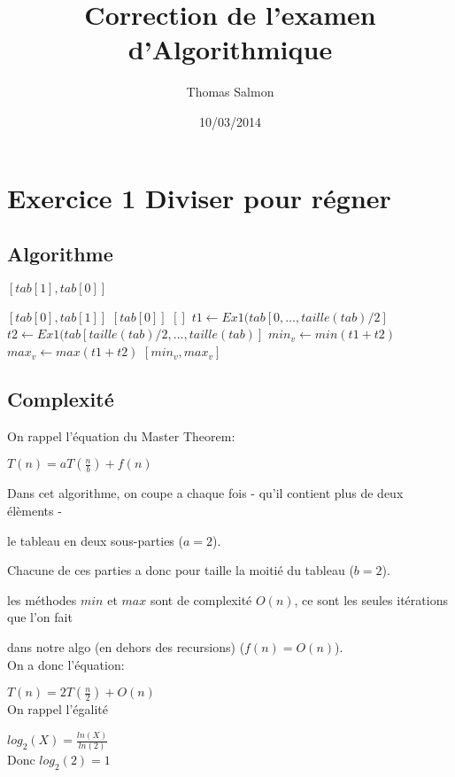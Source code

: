 \documentclass[a4paper]{article}
\title{Correction de l'examen d'Algorithmique}
\author{Thomas Salmon}
\date{10/03/2014}
\begin{document}
\maketitle
\section{Exercice 1 Diviser pour régner}
\subsection{Algorithme}
\begin{algorithmic}
	
		\State \Return $[tab[1], tab[0]]$
	\Else
	
		\State \Return $[tab[0], tab[1]]$
	\EndIf
{}
	\State \Return $[tab[0]]$
	\State \Return $[]$
\Else
\State $t1\gets Ex1(tab[0, \dots, taille(tab)/2]$
\State $t2\gets Ex1(tab[taille(tab)/2, \dots, taille(tab)]$
\State $min_v \gets  min(t1+t2)$
\State	$max_v \gets max(t1+t2)$
\State \Return $[min_v, max_v]$
\EndIf
\EndFunction
\end{algorithmic}
\subsection{Complexité}
On rappel l'équation du Master Theorem:

$T(n) = aT(\frac{n}{b}) + f(n)$

Dans cet algorithme, on coupe a chaque fois - qu'il contient plus de deux élèments - 

le tableau en deux sous-parties ($a = 2$).

Chacune de ces parties a donc pour taille la moitié du tableau ($b = 2$).

les méthodes $min$ et $max$ sont de complexité $O(n)$, ce sont les seules itérations que l'on fait 

dans notre algo (en dehors des recursions) ($f(n) = O(n)$).\\

On a donc l'équation: 

$T(n) = 2T(\frac{n}{2}) + O(n)$\\

On rappel l'égalité

$log_2(X) = \frac{ln(X)}{ln(2)}$\\

Donc $log_2(2) = 1$
\end{document}
